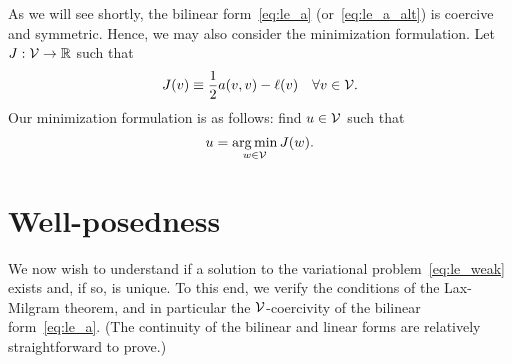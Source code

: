 As we will see shortly, the bilinear form~\eqref{eq:le_a} (or~\eqref{eq:le_a_alt}) is coercive and symmetric.  Hence, we may also consider the minimization formulation.  Let $J : \mathcal{V} \to \mathbb{R}$ such that
\begin{equation}
  J(v) \equiv \frac{1}{2} a(v,v) - \ell(v) \quad \forall v \in \mathcal{V}.
  \label{eq:le_J}
\end{equation}
Our minimization formulation is as follows: find $u \in \mathcal{V}$ such that
\begin{equation*}
  u = \operatorname*{arg\,min}_{w \in \mathcal{V}} J(w).
\end{equation*}


\section{Well-posedness}
\label{sec:le_wellposed}
We now wish to understand if a solution to the variational problem~\eqref{eq:le_weak} exists and, if so, is unique.  To this end, we verify the conditions of the Lax-Milgram theorem, and in particular the $\mathcal{V}$-coercivity of the bilinear form~\eqref{eq:le_a}.  (The continuity of the bilinear and linear forms are relatively straightforward to prove.)

